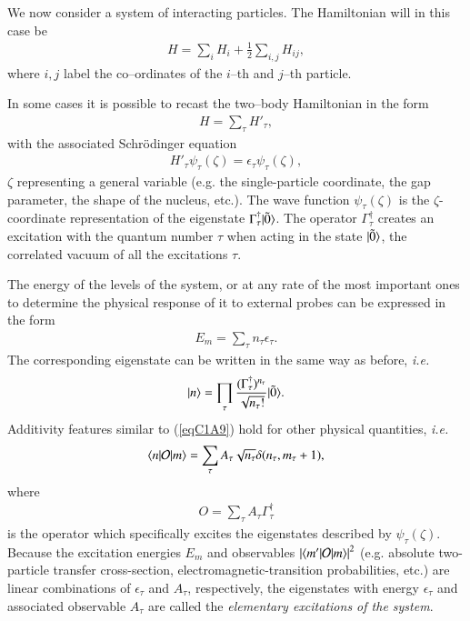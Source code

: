 We now  consider a system of interacting particles. The Hamiltonian will in this case be
\begin{align}\label{eqC1A6}
H=\sum_i H_i+\frac{1}{2}\sum_{i,j}H_{ij},
\end{align}
where $i,j$ label the co--ordinates of the $i$--th and $j$--th particle.

In some cases it is possible to recast the two--body Hamiltonian in the form
\begin{align}\label{eqC1A7}
H=\sum_\tau H'_\tau,
\end{align}
with the associated Schr\"odinger equation
\begin{align}\label{eqC1A8}
H'_\tau\psi_\tau(\zeta)=\epsilon_\tau \psi_\tau(\zeta),
\end{align}
$\zeta$ representing a general variable (e.g. the single-particle coordinate, the gap parameter, the shape of the nucleus, etc.). The wave function $\psi_\tau(\zeta)$ is the $\zeta$-coordinate representation of the eigenstate $\Gamma_\tau^\dagger|{\tilde 0} \rangle$. The operator $\Gamma_\tau^\dagger$ creates an excitation with the quantum number $\tau$ when acting in the state $|{\tilde 0} \rangle$, the correlated vacuum of all the excitations $\tau$.



The energy of the levels of the system, or at any rate of the most important
ones to determine the physical response of it to external probes can be expressed
in the form
\begin{align}\label{eqC1A9}
E_m=\sum_{\tau}n_\tau \epsilon_\tau.
\end{align}
The corresponding eigenstate can be written in the same way as before, \textit{i.e.}
\begin{align}\label{eqC1A10}
|{n} \rangle=\prod_\tau\frac{(\Gamma_\tau^\dagger)^{n_\tau}}{\sqrt{n_\tau!}}|{\tilde 0} \rangle.
\end{align}
Additivity features similar to (\ref{eqC1A9}) hold for other physical quantities, \textit{i.e.}
\begin{align}\label{eqC1A11}
\langle {n|\mathcal O|m} \rangle=\sum_{\tau}A_\tau\sqrt{n_\tau} \delta(n_\tau,m_\tau+1),
\end{align}
where
\begin{align}\label{eqC1A12} O=\sum_{\tau}A_\tau \Gamma_\tau^\dagger
\end{align}
is the operator which specifically excites the eigenstates described by $\psi_\tau(\zeta)$.
Because the excitation energies $E_m$ and observables $\left|\langle {m'|\mathcal O|m} \rangle\right|^2$ (e.g. absolute two-particle transfer cross-section, electromagnetic-transition probabilities, etc.) are
linear combinations of $\epsilon_\tau$ and $A_\tau$, respectively, the eigenstates with energy $\epsilon_\tau$
and associated observable $A_\tau$ are called the \textit{elementary excitations of the system}.


